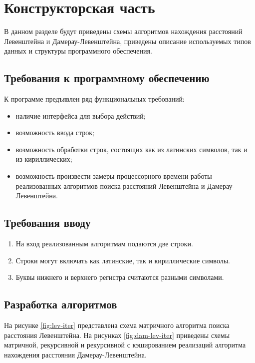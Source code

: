 \chapter{Конструкторская часть}

В данном разделе будут приведены схемы алгоритмов нахождения расстояний Левенштейна и Дамерау-Левенштейна, приведены описание используемых типов данных и структуры программного обеспечения.

\section{Требования к программному обеспе\-чению}

К программе предъявлен ряд функциональных требований:

\begin{itemize}
    \item наличие интерфейса для выбора действий;
    \item возможность ввода строк;
    \item возможность обработки строк, состоящих как из латинских символов, так и из кириллических;
    \item возможность произвести замеры процессорного времени работы ре\-ализованных алгоритмов поиска расстояний Левенштейна и Дамерау-Левенштейна.
\end{itemize}

\section{Требования вводу}

\begin{enumerate}
    \item На вход реализованным алгоритмам подаются две строки.
    \item Строки могут включать как латинские, так и кириллические сим\-волы.
    \item Буквы нижнего и верхнего регистра считаются разными символами.
\end{enumerate}

\section{Разработка алгоритмов}

На рисунке \ref{fig:lev-iter} представлена схема матричного алгоритма поиска расстояния Левенштейна.
На рисунках \ref{fig:dam-lev-iter} приведены схемы матричной, рекурсивной и рекурсивной с кэшированием реализаций алгоритма нахож\-дения расстояния Дамерау-Левенштейна.

